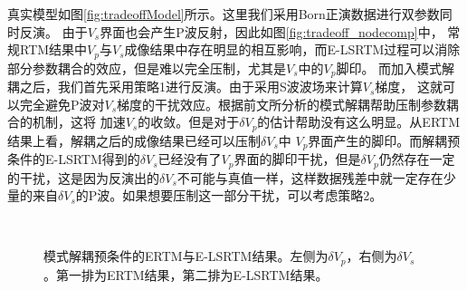 真实模型如图\ref{fig:tradeoffModel}所示。这里我们采用Born正演数据进行双参数同时反演。
由于$V_s$界面也会产生P波反射，因此如图\ref{fig:tradeoff_nodecomp}中，
常规RTM结果中$V_p$与$V_s$成像结果中存在明显的相互影响，而E-LSRTM过程可以消除部分参数耦合的效应，但是难以完全压制，尤其是$V_s$中的$V_p$脚印。
而加入模式解耦之后，我们首先采用策略1进行反演。由于采用S波波场来计算$V_s$梯度，
这就可以完全避免P波对$V_s$梯度的干扰效应。根据前文所分析的模式解耦帮助压制参数耦合的机制，这将
加速$V_s$的收敛。但是对于$\delta
V_p$的估计帮助没有这么明显。从ERTM结果上看，解耦之后的成像结果已经可以压制$\delta V_s$中
$V_p$界面产生的脚印。而解耦预条件的E-LSRTM得到的$\delta
V_s$已经没有了$V_p$界面的脚印干扰，但是$\delta
V_p$仍然存在一定的干扰，这是因为反演出的$\delta
V_s$不可能与真值一样，这样数据残差中就一定存在少量的来自$\delta
V_s$的P波。如果想要压制这一部分干扰，可以考虑策略2。
\begin{figure}
   \centering
   \\
   \caption{模式解耦预条件的ERTM与E-LSRTM结果。左侧为$\delta V_p$，右侧为$\delta V_s$。第一排为ERTM结果，第二排为E-LSRTM结果。}
   \label{fig:tradeoff_decomp}
\end{figure}

